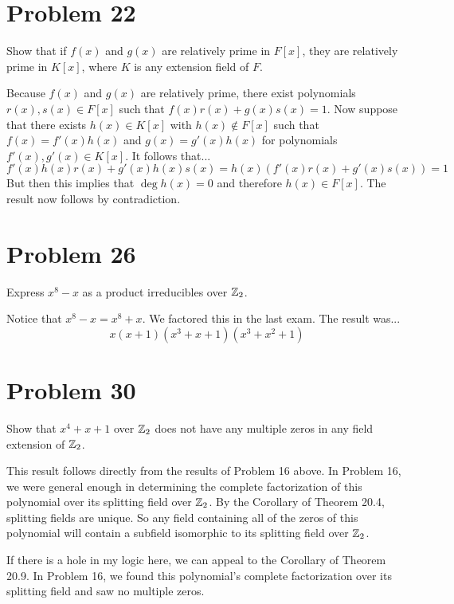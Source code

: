 \documentclass{article}
\begin{document}
\section*{Problem 22}

Show that if $f(x)$ and $g(x)$ are relatively prime in $F[x]$,
they are relatively prime in $K[x]$, where $K$ is any extension field of $F$.

Because $f(x)$ and $g(x)$ are relatively prime, there exist polynomials
$r(x),s(x)\in F[x]$ such that $f(x)r(x)+g(x)s(x)=1$.
Now suppose that there exists $h(x)\in K[x]$ with $h(x)\not\in F[x]$
such that $f(x)=f'(x)h(x)$
and $g(x)=g'(x)h(x)$ for polynomials $f'(x),g'(x)\in K[x]$.
It follows that...
\begin{equation*}
f'(x)h(x)r(x)+g'(x)h(x)s(x)=h(x)(f'(x)r(x)+g'(x)s(x))=1
\end{equation*}
But then this implies that $\deg h(x)=0$ and therefore $h(x)\in F[x]$.
The result now follows by contradiction.

\section*{Problem 26}

Express $x^8-x$ as a product irreducibles over $\mathbb{Z}_2$.

Notice that $x^8-x=x^8+x$.  We factored this in the last exam.
The result was...
\begin{equation*}
x(x+1)(x^3+x+1)(x^3+x^2+1)
\end{equation*}

\section*{Problem 30}

Show that $x^4+x+1$ over $\mathbb{Z}_2$ does not have any multiple zeros in any
field extension of $\mathbb{Z}_2$.

This result follows directly from the results of Problem 16 above.
In Problem 16, we were general enough in determining the complete
factorization of this polynomial over its splitting field over $\mathbb{Z}_2$.
By the Corollary of Theorem 20.4, splitting fields are unique.
So any field containing all of the zeros of this polynomial will
contain a subfield isomorphic to its splitting field over $\mathbb{Z}_2$.

If there is a hole in my logic here, we can appeal to the Corollary
of Theorem 20.9.  In Problem 16, we found this polynomial's complete
factorization over its splitting field and saw no multiple zeros.
\end{document}
